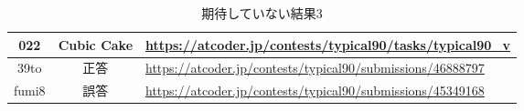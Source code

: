 \begin{table}[h]
    \centering
    \caption{期待していない結果3}
    \label{tab:22}
    \begin{adjustbox}{center}
    \begin{tabular}{|c|c|p{10cm}|}%
        \hline
        022 & Cubic Cake & \url{https://atcoder.jp/contests/typical90/tasks/typical90_v} \\ \hline
        39to &正答 &
        
        \url{https://atcoder.jp/contests/typical90/submissions/46888797} \\ \hline
        fumi8 &誤答 
        & \url{https://atcoder.jp/contests/typical90/submissions/45349168} \\ \hline
    \end{tabular}
    \end{adjustbox}
\end{table}






